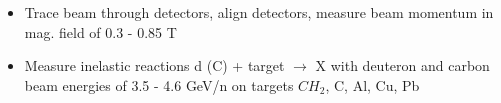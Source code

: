 \documentclass[dvipsnames] {beamer}
\begin{document}
\begin{frame}
{\begin{columns}[t]
    \begin{block}{\bf {}}
      \begin{itemize}
      \item Trace beam through detectors, align detectors, measure beam momentum in mag. field of 0.3 - 0.85 T
      \item Measure inelastic reactions d (C) + target $\rightarrow$ X  with deuteron and carbon beam energies of 3.5 - 4.6 GeV/n on targets $CH_{2}$, C, Al, Cu, Pb
      \end{itemize}
    \end{block}
  \end{columns}
  }
\end{frame}

\end{document}
